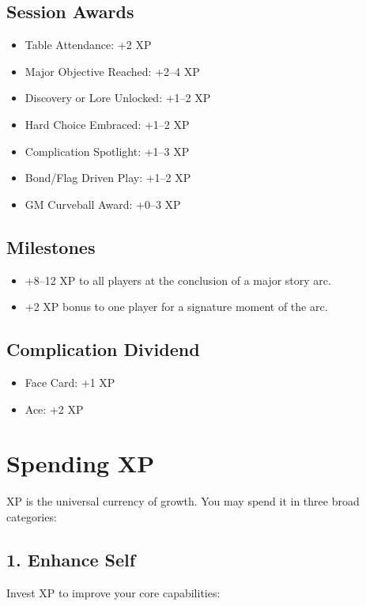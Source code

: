 \subsection*{Session Awards}
\begin{itemize}
    \item Table Attendance: +2 XP
    \item Major Objective Reached: +2–4 XP
    \item Discovery or Lore Unlocked: +1–2 XP
    \item Hard Choice Embraced: +1–2 XP
    \item Complication Spotlight: +1–3 XP
    \item Bond/Flag Driven Play: +1–2 XP
    \item GM Curveball Award: +0–3 XP
\end{itemize}

\subsection*{Milestones}
\begin{itemize}
    \item +8–12 XP to all players at the conclusion of a major story arc.
    \item +2 XP bonus to one player for a signature moment of the arc.
\end{itemize}

\subsection*{Complication Dividend}
\begin{itemize}
    \item Face Card: +1 XP
    \item Ace: +2 XP
\end{itemize}

\section{Spending XP}

XP is the universal currency of growth. You may spend it in three broad categories:

\subsection*{1. Enhance Self}

Invest XP to improve your core capabilities:

